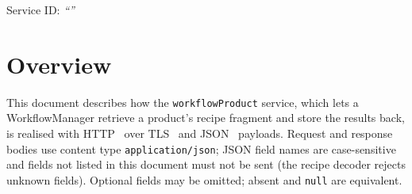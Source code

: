 \documentclass[a4paper]{arrowhead}
\begin{document}
\ArrowheadSetup

\begin{center}
  \vspace*{1cm}
  \huge{\arrowtitle}

  \vspace*{0.2cm}
  \LARGE{\arrowtype}
  \vspace*{1cm}

  \Large{Service ID: \textit{``\arrowid''}}
  \vspace*{\fill}

  

  \vspace*{1cm}
  \vspace*{\fill}

  \begin{abstract}
    This document describes the HTTP/TLS/JSON interface of the \texttt{workflow\allowbreak{}Product} service of the Eclipse Arrowhead workflow support systems, service version 1.0.0, documentation edition 5.4.0. It realises the abstract operations of the \texttt{workflow\allowbreak{}Product} SD.
  \end{abstract}

  \vspace*{1cm}
\end{center}

\newpage

\tableofcontents
\newpage

\section{Overview}
\label{sec:overview}
This document describes how the \texttt{workflow\allowbreak{}Product} service, which lets a WorkflowManager retrieve a product's recipe fragment and store the results back, is realised with HTTP~\cite{rfc9110}
over TLS~\cite{rfc8446} and JSON~\cite{rfc8259} payloads. Request and response bodies use content type
\texttt{application/\allowbreak{}json}; JSON field names are case-sensitive and fields not listed in this document must not be sent
(the recipe decoder rejects unknown fields). Optional fields may be omitted; absent and \texttt{null} are equivalent.
\end{document}
